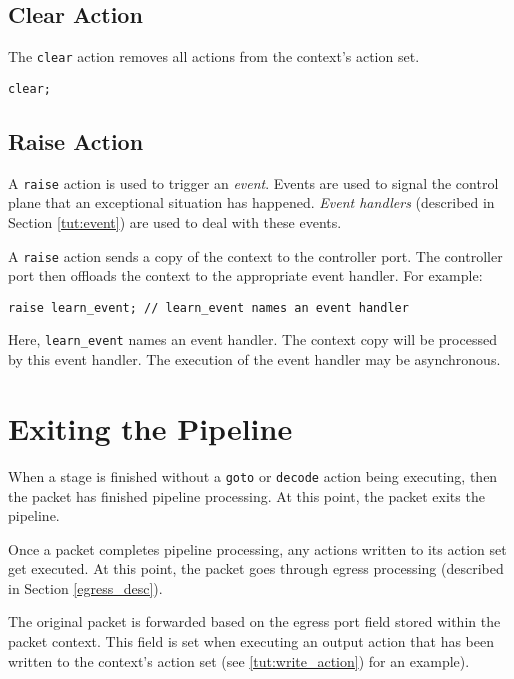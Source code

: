 \subsection{Clear Action} \label{tut:clear_action}

The \texttt{clear} action removes all actions from the context's action set.

\begin{lstlisting}
clear;
\end{lstlisting}

\subsection{Raise Action} \label{tut:raise_action}

A \texttt{raise} action is used to trigger an \textit{event}. Events are used to
signal the control plane that an exceptional situation has happened.
\textit{Event handlers} (described in Section \ref{tut:event}) are used to
deal with these events.

A \texttt{raise} action sends a copy of the context to the controller port.
The controller port then offloads the context to the appropriate event handler.
For example:

\begin{lstlisting}
raise learn_event; // learn_event names an event handler 
\end{lstlisting}

Here, \texttt{learn\_event} names an event handler. The context copy
will be processed by this event handler. The execution of the event
handler may be asynchronous. 

\section{Exiting the Pipeline} \label{tut:pipeline_exit}

When a stage is finished without a \texttt{goto} or \texttt{decode}
action being executing, then the packet has finished pipeline
processing.
At this point, the packet exits the pipeline.

Once a packet completes pipeline processing, any actions written to its action
set get executed. 
At this point, the packet goes through egress processing (described in Section
\ref{egress_desc}).

The original packet is forwarded based on the egress port field stored
within the packet context. This field is set when executing an
output action that has been written to the context's action set
(see \ref{tut:write_action}) for an example).

